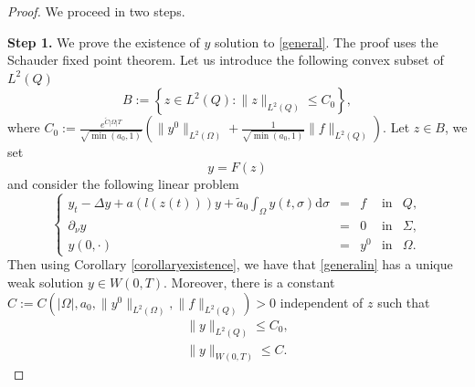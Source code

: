 \documentclass[reqno,twoside]{amsart}
\numberwithin{equation}{section}
\theoremstyle{definition}
\numberwithin{equation}{section}
\def \dis {\displaystyle}
\def \C {\mathcal{C}}
\def \C {{\mathcal C}}
\def \d {\mathrm{d}}
\def \C {\mathcal{C}}
\def \C {{\mathcal C}}
\begin{document}
\begin{proof} We proceed in two steps.
	
	\noindent \textbf{Step 1.} We prove the existence of $y$ solution to \eqref{general}.
	The proof uses the Schauder fixed point theorem.
	Let us introduce the following convex subset of $L^2(Q)$
	$$B:=\left\{z\in L^2(Q):\|z\|_{L^2(Q)}\leq C_0\right\},$$
	where $\dis C_0:=\frac{e^{\tilde{C}|\Omega|T}}{\sqrt{\min(a_0,1)}}\left(\|y^0\|_{L^2(\Omega)}+\frac{1}{\sqrt{\min(a_0,1)}}\|f\|_{L^2(Q)}\right).$
	Let $z\in B$, we set
	\begin{equation}\label{defF}
		y=F(z)
	\end{equation}
	and consider the following linear problem
	\begin{equation}\label{generalin}
		\left\{
		\begin{array}{rllll}
			\dis y_t-\Delta y+a(l(z(t)))y+\tilde{a}_0\int_{\Omega}y(t,\sigma)\d \sigma &=& f &\mbox{in}& Q,\\
			\dis \partial_{\nu}y&=&0  &\mbox{in}& \Sigma,\\
			y(0,\cdot)&=& y^0 &\mbox{in}& \Omega.
		\end{array}
		\right.
	\end{equation}
	Then using Corollary \ref{corollaryexistence}, we have that \eqref{generalin} has a unique weak solution $y\in W(0,T)$. Moreover, there is a constant $C:=C(|\Omega|,a_0,\|y^0\|_{L^2(\Omega)}, \|f\|_{L^2(Q)})>0$ independent of $z$ such that
	\begin{equation}\label{est}
		\begin{array}{lll}
			\dis \|y\|_{L^2(Q)}\leq C_0,\\
			\dis \|y\|_{W(0,T)}\leq C.
		\end{array}
	\end{equation}
	

\end{proof}
\end{document}

